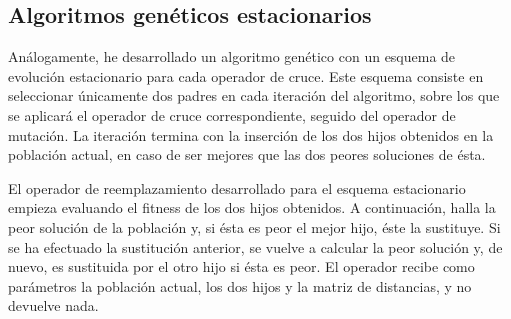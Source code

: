 \documentclass[10pt,a4paper]{article}
\begin{document}
\subsection{Algoritmos genéticos estacionarios}

Análogamente, he desarrollado un algoritmo genético con un esquema de evolución estacionario para cada operador de cruce. Este esquema consiste en seleccionar únicamente dos padres en cada iteración del algoritmo, sobre los que se aplicará el operador de cruce correspondiente, seguido del operador de mutación. La iteración termina con la inserción de los dos hijos obtenidos en la población actual, en caso de ser mejores que las dos peores soluciones de ésta.

El operador de reemplazamiento desarrollado para el esquema estacionario empieza evaluando el fitness de los dos hijos obtenidos. A continuación, halla la peor solución de la población y, si ésta es peor el mejor hijo, éste la sustituye. Si se ha efectuado la sustitución anterior, se vuelve a calcular la peor solución y, de nuevo, es sustituida por el otro hijo si ésta es peor. El operador recibe como parámetros la población actual, los dos hijos y la matriz de distancias, y no devuelve nada.\\
\end{document}
